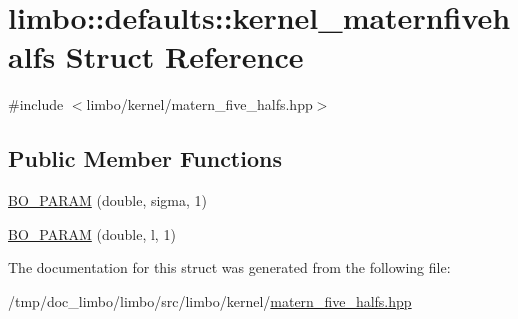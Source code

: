 \hypertarget{structlimbo_1_1defaults_1_1kernel__maternfivehalfs}{}\section{limbo\+:\+:defaults\+:\+:kernel\+\_\+maternfivehalfs Struct Reference}
\label{structlimbo_1_1defaults_1_1kernel__maternfivehalfs}


{\ttfamily \#include $<$limbo/kernel/matern\+\_\+five\+\_\+halfs.\+hpp$>$}

\subsection*{Public Member Functions}
\begin{DoxyCompactItemize}
\item 
\hyperlink{group__kernel__defaults_ga784d4f60df0708935c742652168d132c}{B\+O\+\_\+\+P\+A\+R\+A\+M} (double, sigma, 1)
\item 
\hyperlink{group__kernel__defaults_gaae66735209158acd497dc5034fa535ff}{B\+O\+\_\+\+P\+A\+R\+A\+M} (double, l, 1)
\end{DoxyCompactItemize}


The documentation for this struct was generated from the following file\+:\begin{DoxyCompactItemize}
\item 
/tmp/doc\+\_\+limbo/limbo/src/limbo/kernel/\hyperlink{matern__five__halfs_8hpp}{matern\+\_\+five\+\_\+halfs.\+hpp}\end{DoxyCompactItemize}
